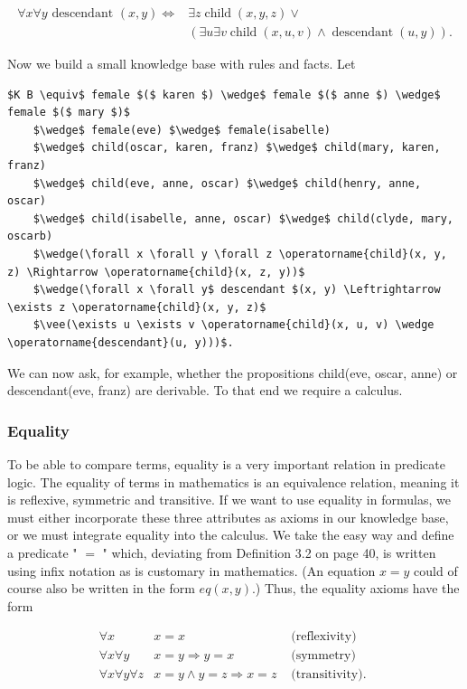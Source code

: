\documentclass[10pt]{book}
\begin{document}
$$
\begin{aligned}
\forall x \forall y \text { descendant }(x, y) \Leftrightarrow & \exists z \operatorname{child}(x, y, z) \vee \\
& (\exists u \exists v \operatorname{child}(x, u, v) \wedge \operatorname{descendant}(u, y)) .
\end{aligned}
$$

Now we build a small knowledge base with rules and facts. Let

\begin{verbatim}
$K B \equiv$ female $($ karen $) \wedge$ female $($ anne $) \wedge$ female $($ mary $)$
    $\wedge$ female(eve) $\wedge$ female(isabelle)
    $\wedge$ child(oscar, karen, franz) $\wedge$ child(mary, karen, franz)
    $\wedge$ child(eve, anne, oscar) $\wedge$ child(henry, anne, oscar)
    $\wedge$ child(isabelle, anne, oscar) $\wedge$ child(clyde, mary, oscarb)
    $\wedge(\forall x \forall y \forall z \operatorname{child}(x, y, z) \Rightarrow \operatorname{child}(x, z, y))$
    $\wedge(\forall x \forall y$ descendant $(x, y) \Leftrightarrow \exists z \operatorname{child}(x, y, z)$
    $\vee(\exists u \exists v \operatorname{child}(x, u, v) \wedge \operatorname{descendant}(u, y)))$.
\end{verbatim}

We can now ask, for example, whether the propositions child(eve, oscar, anne) or descendant(eve, franz) are derivable. To that end we require a calculus.

\subsubsection*{Equality}
To be able to compare terms, equality is a very important relation in predicate logic. The equality of terms in mathematics is an equivalence relation, meaning it is reflexive, symmetric and transitive. If we want to use equality in formulas, we must either incorporate these three attributes as axioms in our knowledge base, or we must integrate equality into the calculus. We take the easy way and define a predicate " $=$ " which, deviating from Definition 3.2 on page 40, is written using infix notation as is customary in mathematics. (An equation $x=y$ could of course also be written in the form $e q(x, y)$.) Thus, the equality axioms have the form

\[
\begin{array}{rll}
\forall x & x=x & \text { (reflexivity) } \\
\forall x \forall y & x=y \Rightarrow y=x & \text { (symmetry) }  \tag{3.1}\\
\forall x \forall y \forall z & x=y \wedge y=z \Rightarrow x=z & \text { (transitivity). }
\end{array}
\]
\end{document}
